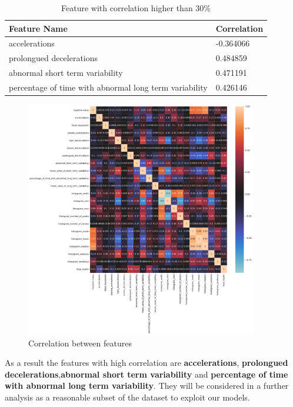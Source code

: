 \documentclass[a4paper,12pt]{article}
\begin{document}
\begin{table}[H]
\begin{tabular}{ |p{10cm}||p{3cm}| }
  \hline
  Feature Name& Correlation \\
  \hline
  accelerations&                                            -0.364066\\
  prolongued decelerations&                                  0.484859\\
  abnormal short term variability&                           0.471191\\
  percentage of time with abnormal long term variability&    0.426146\\
  \hline
\end{tabular}
\caption{Feature with correlation higher than 30\%}
\label{tab:correlation}
\end{table}

\begin{figure}[H]
  \begin{center}
  \includegraphics[width=0.9\textwidth]{images/correlation.png}
  \end{center}
  \caption{Correlation between features}
  \label{fig:correlation}
\end{figure}

\noindent As a result the features with high correlation are \textbf{accelerations}, \textbf{prolongued decelerations},\textbf{abnormal short term variability} and \textbf{percentage of time with abnormal long term variability}. They will be considered in a further analysis as a reasonable subset of the dataset to exploit our models.
\end{document}
